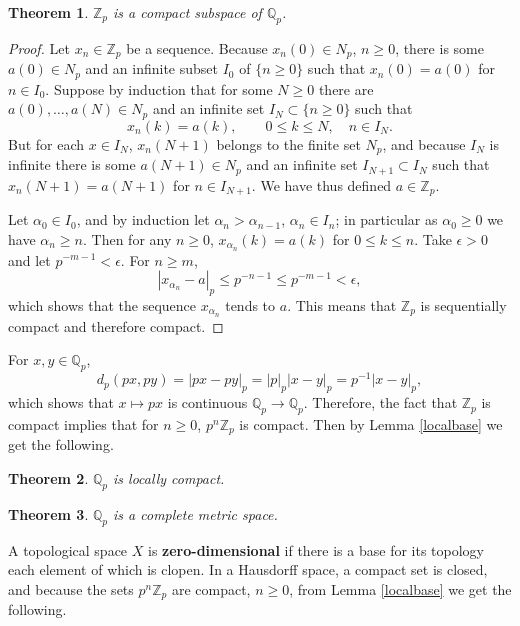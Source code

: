 \documentclass{article}
\newtheorem{theorem}{Theorem}
\theoremstyle{definition}
\begin{document}
\begin{theorem}
$\mathbb{Z}_p$ is a compact subspace of $\mathbb{Q}_p$.
\end{theorem}
\begin{proof}
Let $x_n \in \mathbb{Z}_p$ be a sequence. Because $x_n(0) \in N_p$, $n \geq 0$, there is some
$a(0) \in N_p$ and an infinite subset $I_0$ of $\{n \geq 0\}$ such that 
$x_n(0) = a(0)$ for $n \in I_0$. 
Suppose by induction that for some $N \geq 0$ there are $a(0),\ldots,a(N) \in N_p$ and 
an infinite set $I_N \subset \{n \geq 0\}$ such that
\[
x_n(k) = a(k),\qquad 0 \leq k \leq N, \quad n \in I_N.
\]
But for each $x \in I_N$, $x_n(N+1)$ belongs to the finite set $N_p$, and because $I_N$ is infinite there is
some $a(N+1) \in N_p$ and
an infinite set $I_{N+1} \subset I_N$ such that
$x_n(N+1) = a(N+1)$ for $n \in I_{N+1}$. 
We have thus defined $a \in \mathbb{Z}_p$. 

Let $\alpha_0 \in I_0$, and by induction let $\alpha_n > \alpha_{n-1}$, $\alpha_n \in I_n$; in particular
as $\alpha_0 \geq 0$ we have $\alpha_n \geq n$. 
Then for any $n \geq 0$,
$x_{\alpha_n}(k)=a(k)$ for $0 \leq k \leq n$. 
Take $\epsilon>0$ and let $p^{-m-1}<\epsilon$. For $n \geq m$,
\[
|x_{\alpha_n}-a|_p \leq p^{-n-1} \leq p^{-m-1}< \epsilon,
\]
which shows that the sequence $x_{\alpha_n}$ tends to $a$. This means that
$\mathbb{Z}_p$ is sequentially compact and therefore compact. 
\end{proof}



For $x,y \in \mathbb{Q}_p$,
\[
d_p(px,py) = |px-py|_p = |p|_p |x-y|_p = p^{-1} |x-y|_p,
\]
which shows that $x \mapsto px$ is continuous $\mathbb{Q}_p \to \mathbb{Q}_p$. 
Therefore, the fact that $\mathbb{Z}_p$ is compact implies that
for $n \geq 0$, $p^n \mathbb{Z}_p$ is compact. Then by Lemma \ref{localbase} we get the following.

\begin{theorem}
$\mathbb{Q}_p$ is locally compact.
\end{theorem}




\begin{theorem}
$\mathbb{Q}_p$ is a complete metric space.
\end{theorem}



A topological space $X$ is \textbf{zero-dimensional} 
if there is a base for its topology each element of which is clopen. In a Hausdorff space,
a compact set is closed, and because the sets $p^n \mathbb{Z}_p$ are compact, $n \geq 0$, from
Lemma \ref{localbase} we get the following.
\end{document}
